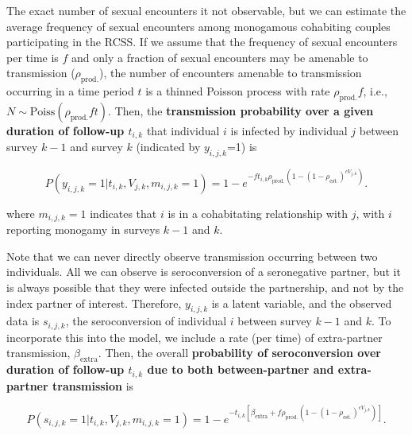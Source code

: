 \documentclass{article}[11pt]
\begin{document}
The exact number of sexual encounters it not observable, but we can estimate the average frequency of sexual encounters among monogamous cohabiting couples participating in the RCSS. If we assume that the frequency of sexual encounters per time is $f$ and only a fraction of sexual encounters may be amenable to transmission ($\rho_{\text{prod.}}$), the number of encounters amenable to transmission occurring in a time period $t$ is a thinned Poisson process with rate $\rho_{\text{prod.}} f$, i.e., $N \sim \text{Poiss}(\rho_{\text{prod.}} f t)$. Then, the \textbf{transmission probability over a given duration of follow-up $t_{i,k}$} that individual $i$ is infected by individual $j$ between survey $k-1$ and survey $k$ (indicated by $y_{i,j,k}$=1) is 

\begin{equation}
P(y_{i,j,k}=1|t_{i,k},V_{j,k}, m_{i,j,k}=1) = 1-e^{- f t_{i,k} \rho_{\text{prod.}} \left(1-\left(1-\rho_{\text{est.}}\right)^{c V_{j,k}}\right) }.
\label{eq:prob_intra_trans}
\end{equation}

where $m_{i,j,k}=1$ indicates that $i$ is in a cohabitating relationship with $j$, with $i$ reporting monogamy in surveys $k-1$ and $k$.

Note that we can never directly observe transmission occurring between two individuals. All we can observe is seroconversion of a seronegative partner, but it is always possible that they were infected outside the partnership, and not by the index partner of interest. Therefore, $y_{i,j,k}$ is a latent variable, and the observed data is $s_{i,j,k}$, the seroconversion of individual $i$ between survey $k-1$ and $k$. To incorporate this into the model, we include a rate (per time) of extra-partner transmission, $\beta_\text{extra}$. Then, the overall \textbf{probability of seroconversion over duration of follow-up $t_{i,k}$ due to both between-partner and extra-partner transmission} is

\begin{equation}
P(s_{i,j,k}=1|t_{i,k},V_{j,k}, m_{i,j,k}=1) = 1-e^{-t_{i,k}\left[\beta_\text{extra} + f \rho_{\text{prod.}} \left(1-\left(1-\rho_{\text{est.}}\right)^{c V_{j,k}}\right) \right]}.
\end{equation}
\end{document}
